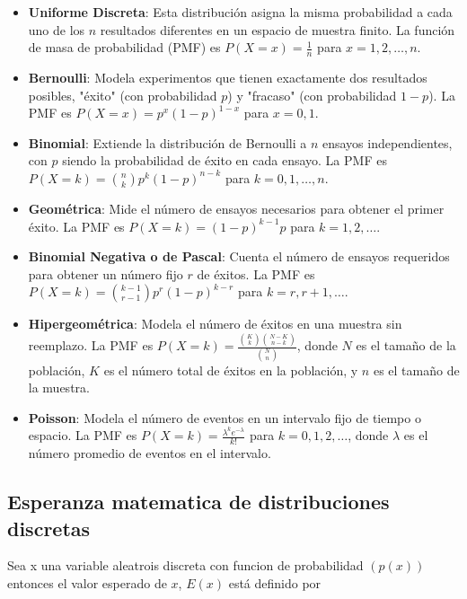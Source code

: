 \documentclass{article}
\begin{document}
\begin{itemize}
    \item \textbf{Uniforme Discreta}: Esta distribución asigna la misma probabilidad a cada uno de los $n$ resultados diferentes en un espacio de muestra finito. La función de masa de probabilidad (PMF) es $P(X = x) = \frac{1}{n}$ para $x = 1, 2, \ldots, n$.

    \item \textbf{Bernoulli}: Modela experimentos que tienen exactamente dos resultados posibles, "éxito" (con probabilidad $p$) y "fracaso" (con probabilidad $1-p$). La PMF es $P(X = x) = p^x(1-p)^{1-x}$ para $x = 0, 1$.

    \item \textbf{Binomial}: Extiende la distribución de Bernoulli a $n$ ensayos independientes, con $p$ siendo la probabilidad de éxito en cada ensayo. La PMF es $P(X = k) = \binom{n}{k}p^k(1-p)^{n-k}$ para $k = 0, 1, \ldots, n$.

    \item \textbf{Geométrica}: Mide el número de ensayos necesarios para obtener el primer éxito. La PMF es $P(X = k) = (1-p)^{k-1}p$ para $k = 1, 2, \ldots$.

    \item \textbf{Binomial Negativa o de Pascal}: Cuenta el número de ensayos requeridos para obtener un número fijo $r$ de éxitos. La PMF es $P(X = k) = \binom{k-1}{r-1}p^r(1-p)^{k-r}$ para $k = r, r+1, \ldots$.

    \item \textbf{Hipergeométrica}: Modela el número de éxitos en una muestra sin reemplazo. La PMF es $P(X = k) = \frac{\binom{K}{k}\binom{N-K}{n-k}}{\binom{N}{n}}$, donde $N$ es el tamaño de la población, $K$ es el número total de éxitos en la población, y $n$ es el tamaño de la muestra.

    \item \textbf{Poisson}: Modela el número de eventos en un intervalo fijo de tiempo o espacio. La PMF es $P(X = k) = \frac{\lambda^k e^{-\lambda}}{k!}$ para $k = 0, 1, 2, \ldots$, donde $\lambda$ es el número promedio de eventos en el intervalo.
\end{itemize}

\subsection{Esperanza matematica de distribuciones discretas}

Sea x una variable aleatrois discreta con funcion de probabilidad $(p(x))$ entonces el valor esperado de $x$, $E(x)$ está definido por
\end{document}
